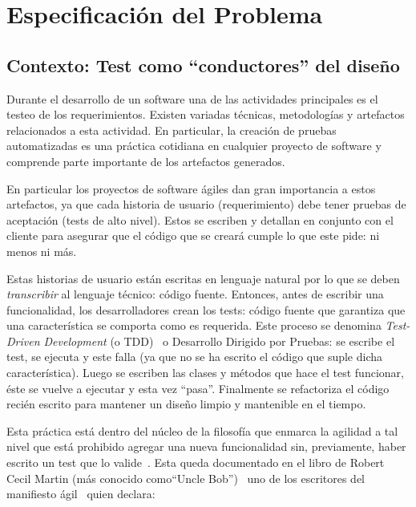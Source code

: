 \chapter{Especificación del Problema}



\section{Contexto: Test como ``conductores'' del diseño}
\par Durante el desarrollo de un software una de las actividades principales es el testeo de los requerimientos. Existen variadas técnicas, metodologías y artefactos relacionados a esta actividad. En particular, la creación de pruebas automatizadas es una práctica cotidiana en cualquier proyecto de software y comprende parte importante de los artefactos generados. \\

\par En particular los proyectos de software ágiles dan gran importancia a estos artefactos, ya que cada historia de usuario (requerimiento) debe tener pruebas de aceptación (tests de alto nivel). Estos se escriben y detallan en conjunto con el cliente para asegurar que el código que se creará cumple lo que este pide: ni menos ni más.

\par Estas historias de usuario están escritas en lenguaje natural por lo que se deben \emph{transcribir} al lenguaje técnico: código fuente. Entonces, antes de escribir una funcionalidad, los desarrolladores crean los tests: código fuente que garantiza que una característica se comporta como es requerida. Este proceso se denomina \emph{Test-Driven Development} (o TDD)~\cite{Beck02a}  o Desarrollo Dirigido por Pruebas: se escribe el test, se ejecuta y este falla (ya que no se ha escrito el código que suple dicha característica). Luego se escriben las clases y métodos que hace el test funcionar, éste se vuelve a ejecutar y esta vez ``pasa''. Finalmente se refactoriza el código recién escrito para mantener un diseño limpio y mantenible en el tiempo.

\par Esta práctica está dentro del núcleo de la filosofía que enmarca la agilidad a tal nivel que está prohibido agregar una nueva funcionalidad sin, previamente, haber escrito un test que lo valide~\cite{Beck02a}. Esta queda documentado en el libro de Robert Cecil Martin (más conocido como``Uncle Bob'')~\cite{Mart02b} uno de los escritores del manifiesto ágil~\cite{Fowl01a} quien declara:

